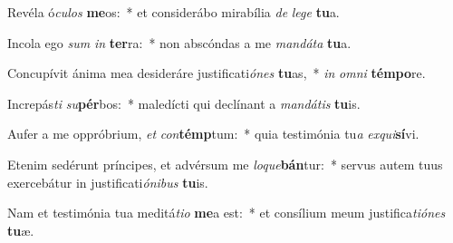 \item Revéla ó\textit{cu}\textit{los} \textbf{me}os:~* et considerábo mirabília \textit{de} \textit{le}\textit{ge} \textbf{tu}a.
\item Incola ego \textit{sum} \textit{in} \textbf{ter}ra:~* non abscóndas a me \textit{man}\textit{dá}\textit{ta} \textbf{tu}a.
\item Concupívit ánima mea desideráre justificati\textit{ó}\textit{nes} \textbf{tu}as,~* \textit{in} \textit{om}\textit{ni} \textbf{tém}\textbf{po}re.
\item Increpás\textit{ti} \textit{su}\textbf{pér}bos:~* maledícti qui declínant a \textit{man}\textit{dá}\textit{tis} \textbf{tu}is.
\item Aufer a me oppróbrium, \textit{et} \textit{con}\textbf{témp}tum:~* quia testimónia tu\textit{a} \textit{ex}\textit{qui}\textbf{sí}vi.
\item Etenim sedérunt príncipes, et advérsum me \textit{lo}\textit{que}\textbf{bán}tur:~* servus autem tuus exercebátur in justificati\textit{ó}\textit{ni}\textit{bus} \textbf{tu}is.
\item Nam et testimónia tua meditá\textit{ti}\textit{o} \textbf{me}a est:~* et consílium meum justifica\textit{ti}\textit{ó}\textit{nes} \textbf{tu}æ.
